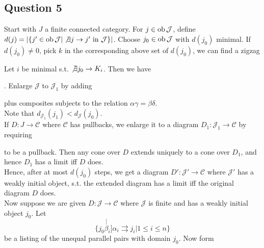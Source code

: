 \documentclass[a4paper]{article}
\begin{document}
\subsection{Question 5}
Start with $J$ a finite connected category. For $j \in \operatorname{ob}\mathcal{J}$, define $d(j) = |\{j' \in \operatorname{ob}\mathcal{J} | \not\exists j \to j' \text{ in } \mathcal{J}\}|$. Choose $j_0 \in \operatorname{ob}\mathcal{J}$ with $d(j_0)$ minimal. If $d(j_0) \neq 0$, pick $k$ in the corresponding above set of $d(j_0)$, we can find a zigzag

Let $i$ be minimal s.t. $\not\exists j_0 \to K_i$. Then we have 
. Enlarge $\mathcal{J}$ to $\mathcal{J}_1$ by adding
plus composites subjects to the relation $\alpha\gamma = \beta\delta$.\\
Note that $d_{\mathcal{J}_1}(j_1) < d_{\mathcal{J}}(j_0)$.\\
If $D:J \to \mathcal{C}$ where $\mathcal{C}$ has pullbacks, we enlarge it to a diagram $D_1: \mathcal{J}_1 \to \mathcal{C}$ by requiring
to be a pullback. Then any cone over $D$ extends uniquely to a cone over $D_1$, and hence $D_1$ has a limit iff $D$ does.\\
Hence, after at most $d(j_0)$ steps, we get a diagram $D': \mathcal{J}' \to \mathcal{C}$ where $\mathcal{J}'$ has a weakly initial object, s.t. the extended diagram has a limit iff the original diagram $D$ does.\\
Now suppose we are given $D:\mathcal{J} \to \mathcal{C}$ where $\mathcal{J}$ is finite and has a weakly initial object $j_0$. Let
$$\{j_0 \stackrel[\beta_i]{\alpha_i}{\rightrightarrows} j_i| 1 \leq i \leq n\}$$
be a listing of the unequal parallel pairs with domain $j_0$. Now form
\end{document}

